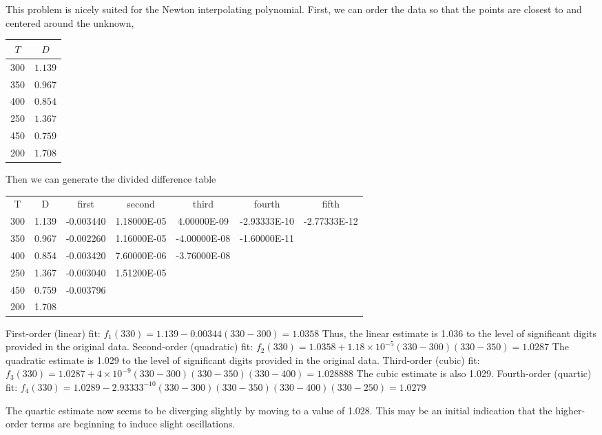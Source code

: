 \documentclass[../main.tex]{subfiles}
\begin{document}
\section{}
\begin{blockquote}
This problem is nicely suited for the Newton interpolating polynomial. First, we can order
the data so that the points are closest to and centered around the unknown,
\end{blockquote}
	\bigbreak
\begin{tabular}{cc}
\hline
$T$ & $D$ \\
\hline
300 & $1.139$ \\
350 & $0.967$ \\
400 & $0.854$ \\
250 & $1.367$ \\
450 & $0.759$ \\
200 & $1.708$ \\
\hline
\end{tabular}
	\bigbreak
Then we can generate the divided difference table
	\bigbreak
\begin{tabular}{ccccccc}
T&D&first&second&third&fourth&fifth\\
300&1.139&-0.003440&1.18000E-05&4.00000E-09&-2.93333E-10&-2.77333E-12\\
350&0.967&-0.002260&1.16000E-05&-4.00000E-08&-1.60000E-11\\
400&0.854&-0.003420&7.60000E-06&-3.76000E-08\\
250&1.367&-0.003040&1.51200E-05\\
450&0.759&-0.003796\\
200&1.708
\end{tabular}
	\bigbreak
First-order (linear) fit:
	\bigbreak
$f_{1}(330)=1.139-0.00344(330-300)=1.0358$
	\bigbreak
Thus, the linear estimate is 1.036 to the level of significant digits provided in the original
data. 
	\bigbreak
Second-order (quadratic) fit:
	\bigbreak
$f_{2}(330)=1.0358+1.18 \times 10^{-5}(330-300)(330-350)=1.0287$
	\bigbreak
The quadratic estimate is 1.029 to the level of significant digits provided in the original
data. 
	\bigbreak
Third-order (cubic) fit:
	\bigbreak
$f_{3}(330)=1.0287+4 \times 10^{-9}(330-300)(330-350)(330-400)=1.028888$
	\bigbreak
The cubic estimate is also 1.029.
	\bigbreak
Fourth-order (quartic) fit:
	\bigbreak
$f_{4}(330)=1.0289-2.93333^{-10}(330-300)(330-350)(330-400)(330-250)=1.0279$
	\bigbreak
\begin{blockquote}
The quartic estimate now seems to be diverging slightly by moving to a value of 1.028.
This may be an initial indication that the higher-order terms are beginning to induce slight
oscillations. 
\end{blockquote}
\end{document}
